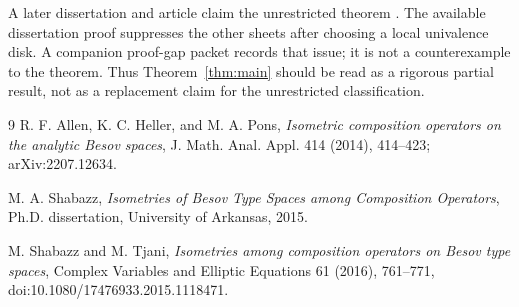 \documentclass[11pt]{article}
\begin{document}
A later dissertation and article claim the unrestricted theorem
\cite{ShabazzThesis,ST}.  The available dissertation proof suppresses the
other sheets after choosing a local univalence disk.  A companion proof-gap
packet records that issue; it is not a counterexample to the theorem.  Thus
Theorem~\ref{thm:main} should be read as a rigorous partial result, not as a
replacement claim for the unrestricted classification.

\begin{thebibliography}{9}
R. F. Allen, K. C. Heller, and M. A. Pons,
\emph{Isometric composition operators on the analytic Besov spaces},
J. Math. Anal. Appl. 414 (2014), 414--423; arXiv:2207.12634.

M. A. Shabazz,
\emph{Isometries of Besov Type Spaces among Composition Operators},
Ph.D. dissertation, University of Arkansas, 2015.

M. Shabazz and M. Tjani,
\emph{Isometries among composition operators on Besov type spaces},
Complex Variables and Elliptic Equations 61 (2016), 761--771,
doi:10.1080/17476933.2015.1118471.
\end{thebibliography}
\end{document}

